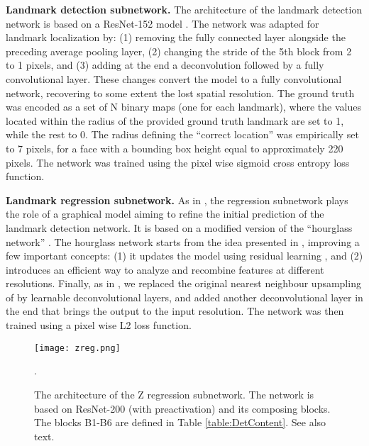 \documentclass[runningheads]{llncs}
\begin{document}
\textbf{Landmark detection subnetwork.}  The architecture of the landmark detection network is based on a ResNet-152 model \cite{he2015deep}. The network was adapted for landmark localization by: (1) removing the fully connected layer alongside the preceding average pooling layer, (2) changing the stride of the 5th block from 2 to 1 pixels, and (3) adding at the end a deconvolution \cite{zeiler2011adaptive} followed by a fully convolutional layer. These changes convert the model to a fully convolutional network, recovering to some extent the lost spatial resolution. The ground truth was encoded as a set of N binary maps (one for each landmark), where the values located within the radius of the provided ground truth landmark are set to 1, while the rest to 0. The radius defining the ``correct location'' was empirically set to 7 pixels, for a face with a bounding box height equal to approximately 220 pixels. The network was trained using the pixel wise sigmoid cross entropy loss function.


\textbf{Landmark regression subnetwork.} As in \cite{myECCV2016}, the regression subnetwork plays the role of a graphical model aiming to refine the initial prediction of the landmark detection network. It is based on a modified version of the ``hourglass network'' \cite{newell2016stacked}. The hourglass network starts from the idea presented in \cite{long2015fully}, improving a few important concepts: (1) it updates the model using residual learning  \cite{he2015deep,he2016identity}, and (2) introduces an efficient way to analyze and recombine features at different resolutions. Finally, as in \cite{myECCV2016}, we replaced the original nearest neighbour upsampling of \cite{newell2016stacked} by learnable deconvolutional layers, and added another deconvolutional layer in the end that brings the output to the input resolution. The network was then trained using a pixel wise L2 loss function. 
 
 \begin{figure}
	\centering 
    \hspace{-1em}
    \vspace{-1em}
	\texttt{[image: zreg.png]}
	\caption{The architecture of the Z regression subnetwork. The network is based on ResNet-200 (with preactivation) and its composing blocks. The blocks B1-B6 are defined in Table \ref{table:DetContent}. See also text.}.
	\label{fig:Our3DNETZ}
\end{figure} 
\end{document}
